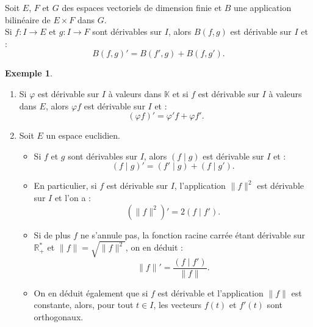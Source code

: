 \documentclass[french]{article}
\newcommand{\R}{\mathbb{R}}
\newcommand{\K}{\mathbb{K}}
\newcommand{\st}{^*}
\theoremstyle{plain}
\theoremstyle{definition}
\newtheorem*{ex}{Exemple}
\theoremstyle{remark}
\begin{document}
\begin{cor}%
	Soit $E$, $F$ et $G$ des espaces vectoriels de dimension finie et $B$ une application bilinéaire de $E\times F$ dans $G$.\\
	Si $f:I\to E$ et $g:I\to F$ sont dérivables sur $I$, alors $B(f,g)$ est dérivable sur $I$ et :
	$$B(f,g)'=B(f',g)+B(f,g').$$
\end{cor}

\begin{ex}
	\begin{enumerate}
		\item Si $\varphi$ est dérivable sur $I$ à valeurs dans $\K$ et si $f$ est dérivable sur $I$ à valeurs dans $E$, alors $\varphi f$ est dérivable sur $I$ et :
		$$(\varphi f)'=\varphi'f+\varphi f'.$$
		\item Soit $E$ un espace euclidien.
		\begin{itemize}
			\item Si $f$ et $g$ sont dérivables sur $I$, alors $(f\mid g)$ est dérivable sur $I$ et :
			$$(f\mid g)'=(f'\mid g)+(f\mid g').$$
			\item En particulier, si $f$ est dérivable sur $I$, l'application $\lVert f\rVert^2$ est dérivable sur $I$ et l'on a :
			$$(\lVert f\rVert^2)'=2(f\mid f').$$
			\item Si de plus $f$ ne s'annule pas, la fonction racine carrée étant dérivable sur $\R_+\st$ et $\lVert f\rVert=\sqrt{\lVert f\rVert^2}$, on en déduit :
			$$\lVert f\rVert'=\frac{(f\mid f')}{\lVert f\rVert}.$$
			\item On en déduit également que si $f$ est dérivable et l'application $\lVert f\rVert$ est constante, alors, pour tout $t\in I$, les vecteurs $f(t)$ et $f'(t)$ sont orthogonaux.
		\end{itemize}
	\end{enumerate}
\end{ex}
\end{document}
